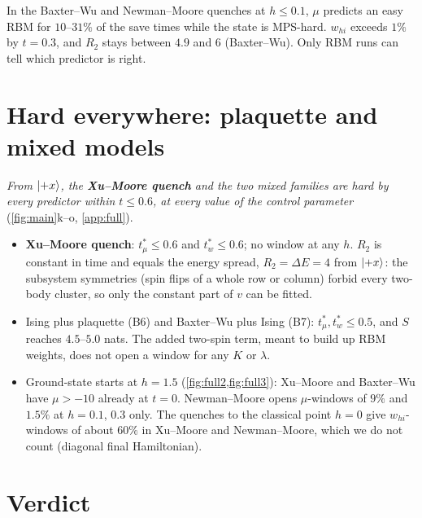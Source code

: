 \documentclass[11pt,a4paper]{article}
\newcommand{\XM}{\textcolor{cXM}{\textbf{Xu--Moore quench}}}
\newcommand{\tmu}{t^*_\mu}
\newcommand{\tw}{t^*_w}
\newcommand{\whi}{w_{hi}}
\begin{document}
\begin{finding}
In the Baxter--Wu and Newman--Moore quenches at $h\le0.1$, $\mu$ predicts an easy RBM for $10$--$31\%$ of the save
times while the state is MPS-hard. $\whi$ exceeds $1\%$ by $t=0.3$, and $R_2$ stays between $4.9$ and $6$
(Baxter--Wu). Only RBM runs can tell which predictor is right.
\end{finding}

\section{Hard everywhere: plaquette and mixed models}
\label{sec:negative}
\emph{From $\ket{+x}$, the \XM{} and the two mixed families are hard by every predictor within $t\le0.6$, at every
value of the control parameter} (\cref{fig:main}k--o, \cref{app:full}).
\begin{itemize}
  \item \XM{}: $\tmu\le0.6$ and $\tw\le0.6$; no window at any $h$. $R_2$ is constant in time and equals the energy
    spread, $R_2=\Delta E=4$ from $\ket{+x}$: the subsystem symmetries (spin flips of a whole row or column) forbid every
    two-body cluster, so only the constant part of $v$ can be fitted.
  \item Ising plus plaquette (B6) and Baxter--Wu plus Ising (B7): $\tmu,\tw\le0.5$, and $S$ reaches $4.5$--$5.0$
    nats. The added two-spin term, meant to build up RBM weights, does not open a window for any $K$ or $\lambda$.
  \item Ground-state starts at $h=1.5$ (\cref{fig:full2,fig:full3}): Xu--Moore and Baxter--Wu have $\mu>-10$ already
    at $t=0$. Newman--Moore opens $\mu$-windows of $9\%$ and $1.5\%$ at $h=0.1$, $0.3$ only. The quenches to the
    classical point $h=0$ give $\whi$-windows of about $60\%$ in Xu--Moore and Newman--Moore, which we do not count
    (diagonal final Hamiltonian).
\end{itemize}

\section{Verdict}
\label{sec:verdict}
\end{document}
